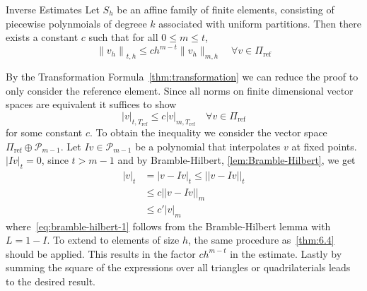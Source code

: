 \begin{thmx}{Inverse Estimates\label{thm:inverse}}
    Let $S_h$ be an affine family of finite elements, consisting of piecewise polynmoials of degreee $k$ associated with uniform partitions. 
    Then there exists a constant $c$ such that for all $0 \leq m \leq t$,
    \begin{equation}
        {\|v_h\|}_{t,h} \leq ch^{m-t}\|v_h\|_{m,h} \quad \forall v \in \Pi_{\text{ref}}
    \end{equation}
\end{thmx}

\begin{bev}
    By the Transformation Formula~\ref{thm:transformation} we can reduce the proof to only consider the reference element. 
    Since all norms on finite dimensional vector spaces are equivalent it suffices to show
    \begin{equation}
        |v|_{t,T_{\text{ref}}} \leq c |v|_{m, T_{\text{ref}}} \quad \forall v \in \Pi_{\text{ref}}
    \end{equation}
    for some constant $c$.
    To obtain the inequality we consider the vector space $\Pi_{\text{ref}}\oplus \mathcal{P}_{m-1}$. Let $Iv \in \mathcal{P}_{m-1}$ be a polynomial that interpolates $v$ at fixed points. $|Iv|_t = 0$, since $t > m-1$ 
    and by Bramble-Hilbert, \ref{lem:Bramble-Hilbert}, we get
    \begin{align}
        |v|_t &= |v-Iv|_t \leq ||v-Iv||_t \\
              &\leq c||v-Iv||_m \\
              &\leq c'|v|_m\label{eq:bramble-hilbert-1}
    \end{align}
    where~\eqref{eq:bramble-hilbert-1} follows from the Bramble-Hilbert lemma with $L=1-I$. To extend to elements of size $h$, the same procedure as~\ref{thm:6.4} should be applied. This results in the factor $ch^{m-t}$ in the estimate. Lastly by summing the square of the expressions over all triangles or quadrilaterials leads to the desired result.
\end{bev}
